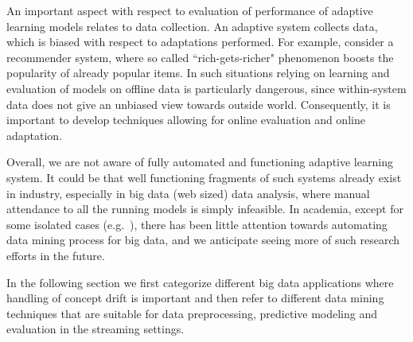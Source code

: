 \documentclass{llncs}
\begin{document}
An important aspect with respect to evaluation of performance of adaptive learning models relates to data collection. An adaptive system collects data, which is biased with respect to adaptations performed. For example, consider a recommender system, where so called ``rich-gets-richer" phenomenon boosts the popularity of already popular items. In such situations relying on learning and evaluation of models on offline data is particularly dangerous, since within-system data does not give an unbiased view towards outside world. Consequently, it is important to develop techniques allowing for online evaluation and online adaptation.

Overall, we are not aware of fully automated and functioning adaptive learning system. It could be that well functioning fragments of such systems already exist in industry, especially in big data (web sized) data analysis, where manual attendance to all the running models is simply infeasible. In academia, except for some isolated cases (e.g.\ \cite{Salvador14}), there has been little attention towards automating data mining process for big data, and we anticipate seeing more of such research efforts in the future.

In the following section we first categorize different big data applications where handling of concept drift is important and then refer to different data mining techniques that are suitable for data preprocessing, predictive modeling and evaluation in the streaming settings.

\end{document}
